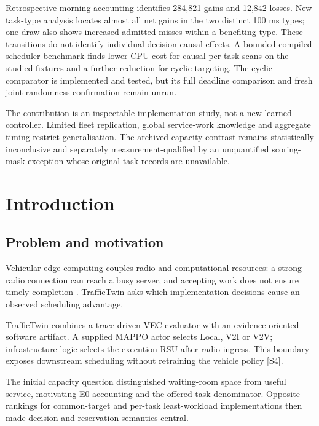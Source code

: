 \documentclass[11pt,a4paper]{article}
\begin{document}
Retrospective morning accounting identifies 284,821 gains and 12,842 losses. New task-type analysis locates almost all net gains in the two distinct 100 ms types; one draw also shows increased admitted misses within a benefiting type. These transitions do not identify individual-decision causal effects. A bounded compiled scheduler benchmark finds lower CPU cost for causal per-task scans on the studied fixtures and a further reduction for cyclic targeting. The cyclic comparator is implemented and tested, but its full deadline comparison and fresh joint-randomness confirmation remain unrun.

The contribution is an inspectable implementation study, not a new learned controller. Limited fleet replication, global service-work knowledge and aggregate timing restrict generalisation. The archived capacity contrast remains statistically inconclusive and separately measurement-qualified by an unquantified scoring-mask exception whose original task records are unavailable.

\section{Introduction}\label{sec:1}

\subsection{Problem and motivation}\label{sec:1.1}

Vehicular edge computing couples radio and computational resources: a strong radio connection can reach a busy server, and accepting work does not ensure timely completion \cite{ref1}. TrafficTwin asks which implementation decisions cause an observed scheduling advantage.

TrafficTwin combines a trace-driven VEC evaluator with an evidence-oriented software artifact. A supplied MAPPO actor selects Local, V2I or V2V; infrastructure logic selects the execution RSU after radio ingress. This boundary exposes downstream scheduling without retraining the vehicle policy \hyperref[source-s4]{[S4]}.

The initial capacity question distinguished waiting-room space from useful service, motivating E0 accounting and the offered-task denominator. Opposite rankings for common-target and per-task least-workload implementations then made decision and reservation semantics central.
\end{document}

